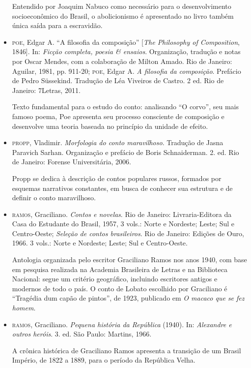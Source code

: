 \documentclass[11pt]{extarticle}
\begin{document}
\begin{itemize}
Entendido por Joaquim Nabuco como necessário para o desenvolvimento socioeconômico 
do Brasil, o abolicionismo é apresentado no livro também única saída para a escravidão.

\item \textsc{poe}, Edgar A. ``A filosofia da composição'' {[}\emph{The Philosophy of
Composition}, 1846{]}. In: \emph{Ficção completa, poesia \& ensaios}.
Organização, tradução e notas por Oscar Mendes, com a colaboração de
Milton Amado. Rio de Janeiro: Aguilar, 1981, pp. 911-20; \textsc{poe}, Edgar A.
\emph{A filosofia da composição}. Prefácio de Pedro Süssekind. Tradução
de Léa Viveiros de Castro. 2 ed. Rio de Janeiro: 7Letras, 2011. 

Texto fundamental para o estudo do conto: analisando ``O corvo'', seu mais
famoso poema, Poe apresenta seu processo consciente de composição e
desenvolve uma teoria baseada no princípio da unidade de efeito.

\item \textsc{propp}, Vladimir. \emph{Morfologia do conto maravilhoso}. Tradução de
Jasna Paravich Sarhan. Organização e prefácio de Boris Schnaiderman. 2.
ed. Rio de Janeiro: Forense Universitária, 2006. 

Propp se dedica à descrição de contos populares russos, formados por esquemas narrativos
constantes, em busca de conhecer sua estrutura e de definir o conto
maravilhoso.

\item \textsc{ramos}, Graciliano. \emph{Contos e novelas}. Rio de Janeiro:
Livraria-Editora da Casa do Estudante do Brasil, 1957, 3 vols.: Norte e
Nordeste; Leste; Sul e Centro-Oeste; \emph{Seleção de contos
brasileiros}. Rio de Janeiro: Edições de Ouro, 1966. 3 vols.: Norte e
Nordeste; Leste; Sul e Centro-Oeste. 

Antologia organizada pelo escritor Graciliano Ramos nos anos 1940, com base em pesquisa 
realizada na Academia Brasileira de Letras e na Biblioteca Nacional: segue um
critério geográfico, incluindo escritores antigos e modernos de todo o
país. O conto de Lobato escolhido por Graciliano é ``Tragédia dum capão
de pintos'', de 1923, publicado em \emph{O macaco que se fez homem}.

\item \textsc{ramos}, Graciliano. \emph{Pequena história da República} (1940). In:
\emph{Alexandre e outros heróis}. 3. ed. São Paulo: Martins, 
1966.

A crônica histórica de Graciliano Ramos apresenta a transição de um Brasil Império, 
de 1822 a 1889, para o período da República Velha.


\end{itemize}
\end{document}
